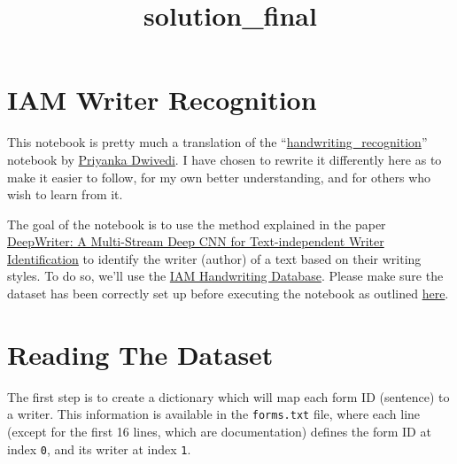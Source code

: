 \documentclass[11pt]{article}
\title{solution\_final}
\begin{document}
    
    \maketitle
    
    

    
    \hypertarget{iam-writer-recognition}{%
\section{IAM Writer Recognition}\label{iam-writer-recognition}}

    This notebook is pretty much a translation of the
``\href{https://github.com/priya-dwivedi/Deep-Learning/tree/master/handwriting_recognition}{handwriting\_recognition}''
notebook by \href{https://github.com/priya-dwivedi}{Priyanka Dwivedi}. I
have chosen to rewrite it differently here as to make it easier to
follow, for my own better understanding, and for others who wish to
learn from it.

    The goal of the notebook is to use the method explained in the paper
\href{https://arxiv.org/abs/1606.06472}{DeepWriter: A Multi-Stream Deep
CNN for Text-independent Writer Identification} to identify the writer
(author) of a text based on their writing styles. To do so, we'll use
the
\href{http://www.fki.inf.unibe.ch/databases/iam-handwriting-database/download-the-iam-handwriting-database}{IAM
Handwriting Database}. Please make sure the dataset has been correctly
set up before executing the notebook as outlined
\href{https://github.com/diegocasmo/iam_writer_recognition/tree/master/data}{here}.

    \hypertarget{reading-the-dataset}{%
\section{Reading The Dataset}\label{reading-the-dataset}}

    The first step is to create a dictionary which will map each form ID
(sentence) to a writer. This information is available in the
\texttt{forms.txt} file, where each line (except for the first 16 lines,
which are documentation) defines the form ID at index \texttt{0}, and
its writer at index \texttt{1}.
\end{document}
